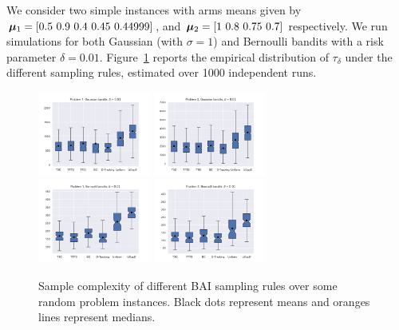 We consider two simple instances with arms means given by $\bmu_1 = [0.5 \ 0.9 \ 0.4 \ 0.45 \ 0.44999]$, and $\bmu_2 = [1 \ 0.8 \ 0.75 \ 0.7]$ respectively. We run simulations for both Gaussian (with $\sigma=1$) and Bernoulli bandits with a risk parameter $\delta=0.01$. %
Figure~\ref{fig:confidence} reports the empirical distribution of $\tau_\delta$ under the different sampling rules, estimated over 1000 independent runs. 

\begin{figure}[ht]
\centering
\includegraphics[clip, width= 0.33\textwidth]{Chapter3/img/gaussian1.pdf}
\includegraphics[clip, width= 0.33\textwidth]{Chapter3/img/gaussian2.pdf}
\includegraphics[clip, width= 0.33\textwidth]{Chapter3/img/bernoulli1.pdf}
\includegraphics[clip, width= 0.33\textwidth]{Chapter3/img/bernoulli2.pdf}
\caption{Sample complexity of different BAI sampling rules over some random problem instances. Black dots represent means and oranges lines represent medians.}
\label{fig:confidence}
\end{figure}


